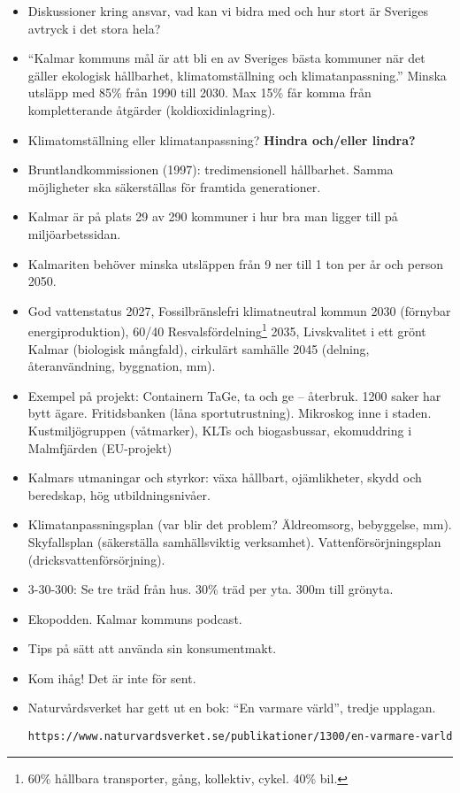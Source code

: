 \documentclass[12pt,a4paper]{article}
\begin{document}
\begin{itemize}
\item Diskussioner kring ansvar, vad kan vi bidra med och hur stort är Sveriges avtryck i det stora hela?
  
\item ``Kalmar kommuns mål är att bli en av Sveriges bästa kommuner när det gäller ekologisk hållbarhet, klimatomställning och klimatanpassning.''
  Minska utsläpp med 85\% från 1990 till 2030.
  Max 15\% får komma från kompletterande åtgärder (koldioxidinlagring).

\item Klimatomställning eller klimatanpassning?
  \textbf{Hindra och/eller lindra?}
  
\item Bruntlandkommissionen (1997): tredimensionell hållbarhet. Samma möjligheter ska säkerställas för framtida generationer. 

\item Kalmar är på plats 29 av 290 kommuner i hur bra man ligger till på miljöarbetssidan.

\item Kalmariten behöver minska utsläppen från 9 ner till 1 ton per år och person 2050.

\item God vattenstatus 2027, Fossilbränslefri klimatneutral kommun 2030 (förnybar energiproduktion), 60/40 Resvalsfördelning\footnote{60\% hållbara transporter, gång, kollektiv, cykel. 40\% bil.} 2035, Livskvalitet i ett grönt Kalmar (biologisk mångfald), cirkulärt samhälle 2045 (delning, återanvändning, byggnation, mm).

\item Exempel på projekt: Containern TaGe, ta och ge -- återbruk. 1200 saker har bytt ägare. Fritidsbanken (låna sportutrustning). Mikroskog inne i staden. Kustmiljögruppen (våtmarker), KLTs och biogasbussar, ekomuddring i Malmfjärden (EU-projekt)

\item Kalmars utmaningar och styrkor: växa hållbart, ojämlikheter, skydd och beredskap, hög utbildningsnivåer.

\item Klimatanpassningsplan (var blir det problem? Äldreomsorg, bebyggelse, mm). Skyfallsplan (säkerställa samhällsviktig verksamhet). Vattenförsörjningsplan (dricksvattenförsörjning).

\item 3-30-300: Se tre träd från hus. 30\% träd per yta. 300m till grönyta.

  \item Ekopodden. Kalmar kommuns podcast.

  \item Tips på sätt att använda sin konsumentmakt.

\item Kom ihåg! Det är inte för sent.

\item Naturvårdsverket har gett ut en bok: ``En varmare värld'', tredje upplagan.
  
  \verb|https://www.naturvardsverket.se/publikationer/1300/en-varmare-varld|

    
\end{itemize}
\end{document}
